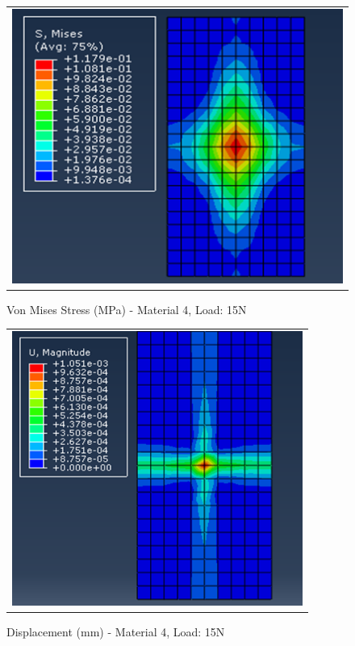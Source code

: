 \documentclass[a4paper,12pt]{article}
\numberwithin{equation}{section}
\numberwithin{figure}{section}
\begin{document}
\begin{figure}[H]
  \centering
  \begin{tabular}{@{}c@{}}
    \includegraphics[width=0.7\linewidth,height=255pt]{Results/Point Loading/M4_VMS_L3.png} \\
  \end{tabular}
  \caption{Von Mises Stress (MPa) - Material 4, Load: 15N}
\end{figure}

\begin{figure}[H]
  \centering
  \begin{tabular}{@{}c@{}}
    \includegraphics[width=0.7\linewidth,height=255pt]{Results/Point Loading/M4_DIS_L3.png} \\
  \end{tabular}
  \caption{Displacement (mm) - Material 4, Load: 15N}
\end{figure}
\end{document}

